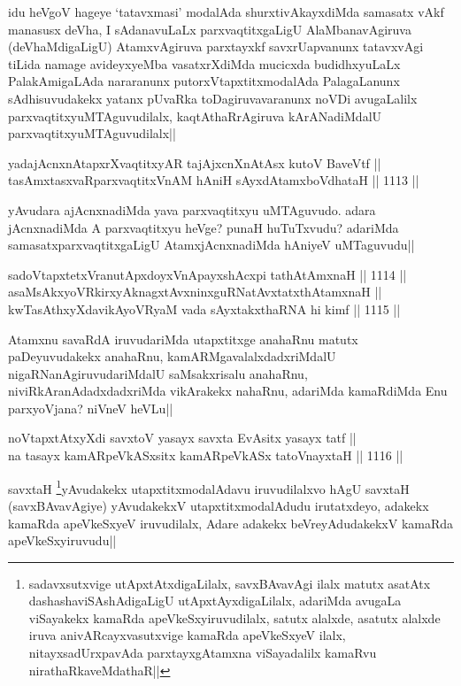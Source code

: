 \begin{artha}
idu heVgoV hageye `tatavxmasi' modalAda shurxtivAkayxdiMda samasatx vAkf manasusx deVha, I sAdanavuLaLx parxvaqtitxgaLigU  AlaMbanavAgiruva (deVhaMdigaLigU) AtamxvAgiruva parxtayxkf savxrUapvanunx tatavxvAgi tiLida namage avideyxyeMba vasatxrXdiMda mucicxda budidhxyuLaLx PalakAmigaLAda nararanunx putorxVtapxtitxmodalAda PalagaLanunx sAdhisuvudakekx yatanx pUvaRka toDagiruvavaranunx noVDi avugaLalilx parxvaqtitxyuMTAguvudilalx, kaqtAthaRrAgiruva kArANadiMdalU parxvaqtitxyuMTAguvudilalx||
\end{artha}

\begin{shl}
yadajAcnxnAtapxrXvaqtitxyAR tajAjxcnXnAtAsx kutoV BaveVtf || \\
tasAmxtasxvaRparxvaqtitxVnAM hAniH sAyxdAtamxboVdhataH ||  1113 ||  
\end{shl}

\begin{artha}
yAvudara ajAcnxnadiMda yava parxvaqtitxyu uMTAguvudo. adara jAcnxnadiMda A parxvaqtitxyu heVge? punaH huTuTxvudu? adariMda samasatxparxvaqtitxgaLigU AtamxjAcnxnadiMda hAniyeV uMTaguvudu||
\end{artha}

\begin{shl}
sadoVtapxtetxVranutApxdoyxV\s nApayxshAcxpi tathA\s \s tAmxnaH ||  1114 ||  \\
asaMsAkxyoVR\s kirxyAknagxtAvxninxguRNatAvxtatxthA\s \s tamxnaH || \\
kwTasAthxyXdavikAyoVR\s yaM vada sAyxtakxthaRNA hi kimf ||  1115 ||  
\end{shl}

\begin{artha}
Atamxnu savaRdA iruvudariMda utapxtitxge anahaRnu matutx paDeyuvudakekx anahaRnu, kamARMgavalalxdadxriMdalU nigaRNanAgiruvudariMdalU saMsakxrisalu anahaRnu, niviRkAranAdadxdadxriMda vikArakekx nahaRnu, adariMda kamaRdiMda Enu parxyoVjana? niVneV heVLu||
\end{artha}

\begin{shl}
noVtapxtAtxyXdi savxtoV yasayx savxta EvAsitx yasayx tatf || \\
na tasayx kamARpeVkASx\s sitx kamARpeVkASx tatoV\s nayxtaH ||  1116 ||  
\end{shl}

\begin{artha}
savxtaH \footnote{sadavxsutxvige utApxtAtxdigaLilalx, savxBAvavAgi ilalx matutx asatAtx dashashaviSAshAdigaLigU utApxtAyxdigaLilalx, adariMda avugaLa viSayakekx kamaRda apeVkeSxyiruvudilalx, satutx alalxde, asatutx alalxde iruva anivARcayxvasutxvige kamaRda apeVkeSxyeV ilalx, nitayxsadUrxpavAda parxtayxgAtamxna viSayadalilx kamaRvu nirathaRkaveMdathaR||}yAvudakekx utapxtitxmodalAdavu iruvudilalxvo hAgU savxtaH (savxBAvavAgiye) yAvudakekxV utapxtitxmodalAdudu irutatxdeyo, adakekx kamaRda apeVkeSxyeV iruvudilalx, Adare adakekx beVreyAdudakekxV kamaRda apeVkeSxyiruvudu||
\end{artha}

